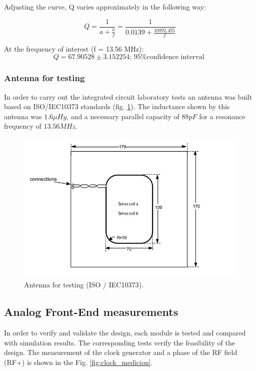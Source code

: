 \documentclass[a4paper, 10pt, conference]{ieeeconf}      %
\begin{document}
Adjusting the curve, Q varies approximately in the following way:

\begin{equation} \label{eq:vref}
 Q = \frac{1}{a + \frac{b}{f}} = \frac{1}{0.0139 + \frac{10892.495}{f}} 
\end{equation}


At the frequency of interest (f = 13.56 MHz):
$$Q = 67.90528 \pm 3.152254 \textrm{; 95\% confidence interval } $$ 

\subsubsection{ Antenna for testing}
In order to carry out the integrated circuit laboratory tests an antenna was built based on ISO/IEC10373 \cite{c7} standards  (fig. \ref{fig:L_test}).
The inductance shown by this antenna was $1.6 \mu Hy$, and a necessary parallel capacity of $88 pF$ for a resonance frequency of 
$13.56 MHz$.


\begin{figure}[H]
\centering
\includegraphics[scale=0.45]{Images/ImagenesTesina/antena/Bobina_Testing.JPG}
\caption{Antenna for testing (ISO / IEC10373).}
\label{fig:L_test}
\end{figure}




\subsection{Analog Front-End measurements}
In order to verify and validate the design, each module
is tested and compared with simulation results. The
corresponding tests verify the feasibility of the design.
The measurement of the clock generator and a phase of
the RF field (RF+) is shown in the Fig. \ref{fig:clock_medicion}. 
\end{document}

